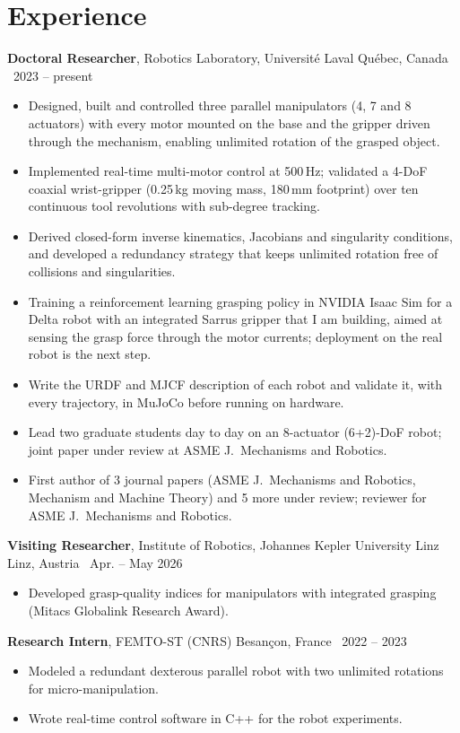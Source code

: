 \documentclass[10pt,a4paper]{article}
\newcommand{\role}[4]{\textbf{#1}, #2 \hfill {\color{muted}#3 \textbar\ #4}\par}
\begin{document}
\section{Experience}
\role{Doctoral Researcher}{Robotics Laboratory, Universit\'e Laval}{Qu\'ebec, Canada}{2023 -- present}
\begin{itemize}
\item Designed, built and controlled three parallel manipulators (4, 7 and 8 actuators) with every motor
mounted on the base and the gripper driven through the mechanism, enabling unlimited rotation of the grasped object.
\item Implemented real-time multi-motor control at 500\,Hz; validated a 4-DoF coaxial wrist-gripper (0.25\,kg moving mass,
180\,mm footprint) over ten continuous tool revolutions with sub-degree tracking.
\item Derived closed-form inverse kinematics, Jacobians and singularity conditions, and developed a redundancy
strategy that keeps unlimited rotation free of collisions and singularities.
\item Training a reinforcement learning grasping policy in NVIDIA Isaac Sim for a Delta robot with an integrated Sarrus
gripper that I am building, aimed at sensing the grasp force through the motor currents; deployment on the real robot is
the next step.
\item Write the URDF and MJCF description of each robot and validate it, with every trajectory, in MuJoCo before running on hardware.
\item Lead two graduate students day to day on an 8-actuator (6+2)-DoF robot; joint paper under review at ASME J.\
Mechanisms and Robotics.
\item First author of 3 journal papers (ASME J.\ Mechanisms and Robotics, Mechanism and Machine Theory) and 5 more
under review; reviewer for ASME J.\ Mechanisms and Robotics.
\end{itemize}

\vspace{3pt}
\role{Visiting Researcher}{Institute of Robotics, Johannes Kepler University Linz}{Linz, Austria}{Apr. -- May 2026}
\begin{itemize}
\item Developed grasp-quality indices for manipulators with integrated grasping (Mitacs Globalink Research Award).
\end{itemize}

\vspace{3pt}
\role{Research Intern}{FEMTO-ST (CNRS)}{Besan\c{c}on, France}{2022 -- 2023}
\begin{itemize}
\item Modeled a redundant dexterous parallel robot with two unlimited rotations for micro-manipulation.
\item Wrote real-time control software in C++ for the robot experiments.
\end{itemize}
\end{document}

